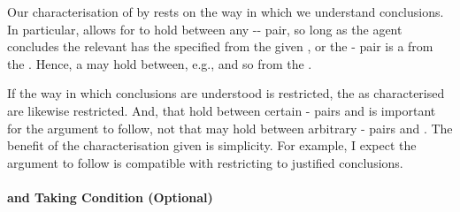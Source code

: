 \begin{note}
  Our characterisation of \ros{} by \supportI{} rests on the way in which we understand conclusions.
  In particular, \supportI{} allows for \ros{} to hold between any -- pair, so long as the agent concludes the relevant  has the specified  from the given \pool{}, or the - pair is a \fc{} from the \pool{}.
  Hence, a \ros{} may hold between, e.g.,  and so \pool{} from the \agpe{}.

  If the way in which conclusions are understood is restricted, the \ros{} as characterised are likewise restricted.
  And, that  hold between certain - pairs and  is important for the argument to follow, not that  may hold between arbitrary - pairs and .
  The benefit of the characterisation given is simplicity.
  For example, I expect the argument to follow is compatible with restricting \ros{} to justified conclusions.
\end{note}



\paragraph*{ and \citeauthor{Boghossian:2014aa} Taking Condition \hfill (Optional)}


